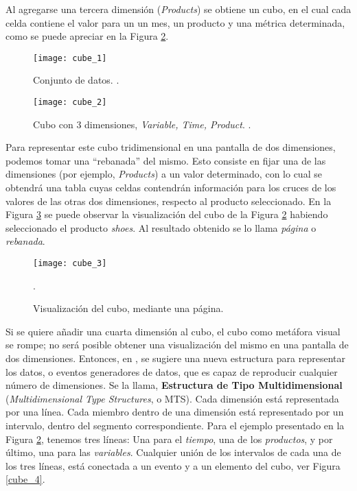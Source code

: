 \documentclass[a4paper,11pt]{article}
\begin{document}
    Al agregarse una tercera dimensión (\textit{Products}) se obtiene un cubo, en el cual cada celda contiene el valor para un un mes,
    un producto y una métrica determinada, como se puede apreciar en la Figura \ref{cube_2}.
    
    \begin{figure}
      \begin{center}
        \texttt{[image: cube\_1]}
        \caption{Conjunto de datos. \cite[p.~48]{olap_solutions}.}
        \label{tab_cube}
      \end{center}
    \end{figure}
    
    \begin{figure}
      \begin{center}
        \texttt{[image: cube\_2]}
        \caption{Cubo con 3 dimensiones, \textit{Variable, Time, Product}. \cite[p.~49]{olap_solutions}.}
        \label{cube_2}
      \end{center}
    \end{figure}
    
    
    Para representar este cubo tridimensional en una pantalla de dos dimensiones, podemos tomar una ``rebanada'' del mismo.
    Esto consiste en fijar una de las dimensiones (por ejemplo, \textit{Products}) a un valor determinado, con lo cual se obtendrá una
    tabla cuyas celdas contendrán información para los cruces de los valores de las otras dos dimensiones, respecto al producto seleccionado. En la Figura
    \ref{cube_3} se puede observar la visualización del cubo de la Figura \ref{cube_2} habiendo seleccionado el producto \textit{shoes}. Al resultado obtenido se
    lo llama \textit{página} o \textit{rebanada}.
    
    \begin{figure}
      \begin{center}
        \texttt{[image: cube\_3]}
        \caption{Visualización del cubo, mediante una página.} \cite[p.~51]{olap_solutions}.
        \label{cube_3}
      \end{center}
    \end{figure}

    Si se quiere añadir una cuarta dimensión al cubo, el cubo como metáfora visual se rompe; no será posible obtener una visualización del mismo en una
    pantalla de dos dimensiones. Entonces, en \cite{olap_solutions}, se sugiere una nueva estructura para representar los datos, o eventos generadores de datos,
    que es capaz de reproducir cualquier número de dimensiones.
    Se la llama, \textbf{Estructura de Tipo Multidimensional} (\textit{Multidimensional Type Structures}, o MTS).
    Cada dimensión está representada por una línea. Cada miembro dentro de una dimensión está representado por un intervalo, dentro del segmento correspondiente.
    Para el ejemplo presentado en la Figura \ref{cube_2}, tenemos tres líneas:
    Una para el \textit{tiempo}, una de los \textit{productos}, y por último, una para las \textit{variables}.
    Cualquier unión de los intervalos de cada una de los tres líneas, está conectada a un evento y a un elemento del cubo, ver Figura \ref{cube_4}.
\end{document}
